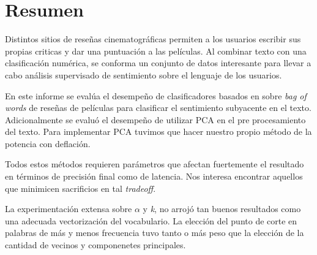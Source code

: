 \section{Resumen}%
\label{sec:abstracto}

Distintos sitios de reseñas cinematográficas permiten a los usuarios escribir
sus propias criticas y dar una puntuación a las películas.
Al combinar texto con una clasificación numérica, se conforma un conjunto de
datos interesante para llevar a cabo análisis supervisado de sentimiento sobre
el lenguaje de los usuarios.

En este informe se evalúa el desempeño de clasificadores basados en \knn{}
sobre \textit{bag of words} de reseñas de películas para clasificar el
sentimiento subyacente en el texto.
Adicionalmente se evaluó el desempeño de utilizar PCA en el pre
procesamiento del texto.
Para implementar PCA tuvimos que hacer nuestro propio método de la potencia con deflación.

Todos estos métodos requieren parámetros que afectan fuertemente el resultado en
términos de precisión final como de latencia. Nos interesa encontrar aquellos
que minimicen sacrificios en tal \textit{tradeoff}.

La experimentación extensa sobre $\alpha$ y \emph{k}, no arrojó tan
buenos resultados como una adecuada vectorización del vocabulario. La
elección del punto de corte en palabras de más y menos frecuencia tuvo
tanto o más peso que la elección de la cantidad de vecinos y
componenetes principales.
